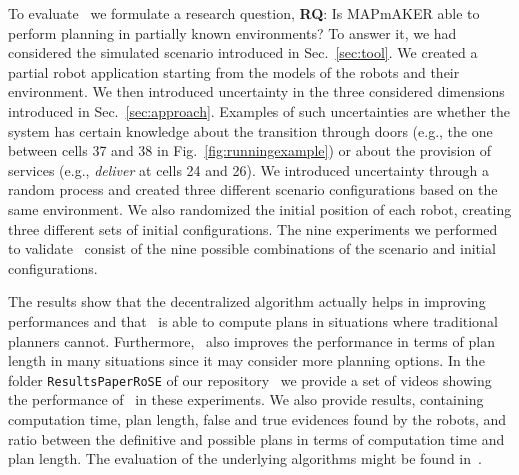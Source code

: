 

To evaluate  \toolName\ we formulate a research question,
\textbf{RQ}: Is MAPmAKER able to perform planning in partially known environments?
To answer it, we  had considered the simulated scenario introduced in Sec.~\ref{sec:tool}.
We created a partial robot application starting from the models of the robots and their environment.
We then introduced uncertainty in the three considered dimensions introduced in Sec.~\ref{sec:approach}.
Examples of such uncertainties are whether the system has certain knowledge about the transition through doors (e.g., the one between cells 37 and 38 in Fig.~\ref{fig:runningexample}) or about the provision of services (e.g., \emph{deliver} at cells 24 and 26).
We introduced uncertainty through a random process and created three different scenario configurations based on the same environment.
We also randomized the initial position of each robot, creating three different sets of initial configurations.
The nine experiments we performed to validate \toolName~consist of the nine possible combinations of the scenario and initial configurations.

The results show that the decentralized algorithm actually helps in improving performances and that \toolName\ is able to compute plans in situations where traditional planners cannot. 
Furthermore, \toolName\ also improves the performance in terms of plan length in many situations since it may consider more planning options.
In the folder \texttt{ResultsPaperRoSE} of our repository~\cite{repo} we provide a set of videos showing the performance of \toolName~in these experiments.
We also provide results, containing computation time, plan length, false and true evidences found by the robots, and ratio between the definitive and possible plans in terms of computation time and plan length.
The evaluation of the underlying algorithms might be found in~\cite{menghi2018multi}. 


